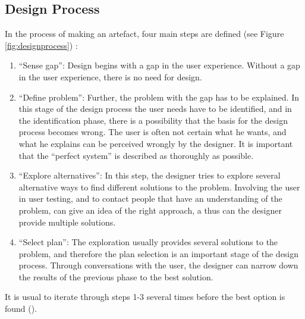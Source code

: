 \subsection{Design Process}
\label{sec:designprocess}
In the process of making an artefact, four main steps are defined (see Figure \ref{fig:designprocess}) :
\begin{enumerate}
 \item ``Sense gap'': Design begins with a gap in the user experience. Without a gap in the user experience, there is no need for design.
 \item ``Define problem'': Further, the problem with the gap has to be explained. In this stage of the design process the user needs have to be identified, and in the identification phase, there is a possibility that the basis for the design process becomes wrong. The user is often not certain what he wants, and what he explains can be perceived wrongly by the designer. It is important that the ``perfect system'' is described as thoroughly as possible.
 \item ``Explore alternatives'': In this step, the designer tries to explore several alternative ways to find different solutions to the problem. Involving the user in user testing, and to contact people that have an understanding of the problem, can give an idea of the right approach, a thus can the designer provide multiple solutions.
     \item ``Select plan'': The exploration usually provides several solutions to the problem, and therefore the plan selection is an important stage of the design process. Through conversations with the user, the designer can narrow down the results of the previous phase to the best solution.
 \end{enumerate}
 It is usual to iterate through steps 1-3 several times before the best option is found (\cite{ulrich}).
 
